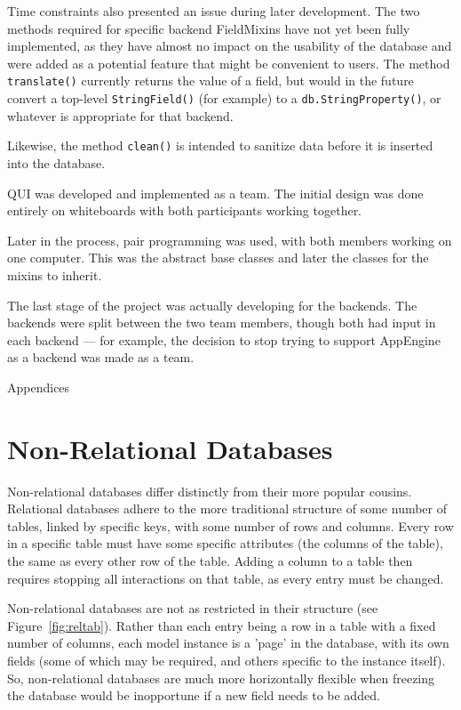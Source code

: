 \documentclass{article} %
\newcommand{\il}[1]{\mbox{\lstinline{#1}}}
\begin{document}
Time constraints also presented an issue during later development. The two methods required for specific backend FieldMixins have not yet been fully implemented, as 
they have almost no impact on the usability of the database and were added as a potential feature that might be convenient to users. The method \il{translate()} currently returns the 
value of a field, but would in the future convert a top-level \il{StringField()} (for example) to a \il{db.StringProperty()}, or whatever is appropriate for that backend.

Likewise, the method \il{clean()} is intended to sanitize data before it is inserted into the database.

QUI was developed and implemented as a team. The initial design was done entirely on whiteboards with both participants working together.

  Later in the process, pair programming was used, with both members working on one computer. This was the abstract base classes and later the classes for the mixins to inherit. 
  
  The last stage of the project was actually developing for the backends. The backends were split between the two team members, though both had input in each backend --- for example, the
   decision to stop trying to support AppEngine as a backend was made as a team.

\newpage
\appendix
\begin{center}Appendices\end{center}

\section{Non-Relational Databases}
Non-relational databases differ distinctly from their more popular cousins. Relational databases adhere to the more traditional structure of some number of tables, linked
by specific keys, with some number of rows and columns. Every row in a specific table must have some specific attributes (the columns of the table), the same as every 
other row of the table. Adding a column to a table then requires stopping all interactions on that table, as every entry must be changed. 

Non-relational databases are not as restricted in their structure (see Figure~\ref{fig:reltab}). Rather than each entry being a row in a table with a fixed number of 
columns, each model instance is a 'page' in the database, with its own fields (some of which may be required, and others specific to the instance itself). So, 
non-relational databases are much more horizontally flexible when freezing the database would be inopportune if a new field needs to be added.
\end{document}
